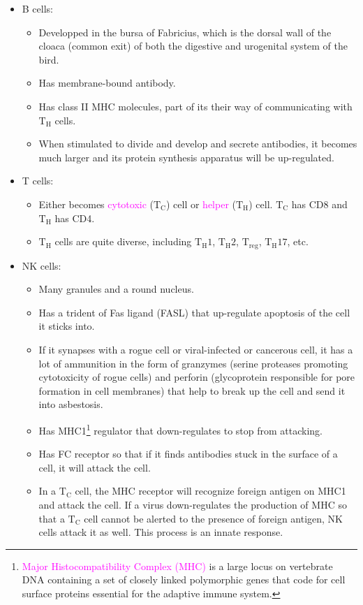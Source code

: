 \documentclass[UTF8]{book}
\newcommand{\concept}[1]{\textcolor{magenta}{#1}}
\begin{document}
\begin{itemize}
\item B cells:
\begin{itemize}
	\item Developped in the bursa of Fabricius, which is the dorsal wall of the cloaca (common exit) of both the digestive and urogenital system of the bird. 
	\item Has membrane-bound antibody.
	\item Has class II MHC molecules, part of its their way of communicating with $\mathrm{T_H}$ cells.
	\item When stimulated to divide and develop and secrete antibodies, it becomes much larger and its protein synthesis apparatus will be up-regulated. 
\end{itemize}
\item T cells:
\begin{itemize}
	\item Either becomes \concept{cytotoxic} ($\mathrm{T_C}$) cell or \concept{helper} ($\mathrm{T_H}$) cell. $\mathrm{T_C}$ has CD8 and $\mathrm{T_H}$ has CD4. 
	\item $\mathrm{T_H}$ cells are quite diverse, including $\mathrm{T_H}1$, $\mathrm{T_H}2$, $\mathrm{T_{reg}}$, $\mathrm{T_H}17$, etc.
\end{itemize}
\item NK cells:
\begin{itemize}
	\item Many granules and a round nucleus.
	\item Has a trident of Fas ligand (FASL) that up-regulate apoptosis of the cell it sticks into.
	\item If it synapses with a rogue cell or viral-infected or cancerous cell, it has a lot of ammunition in the form of granzymes (serine proteases promoting cytotoxicity of rogue cells) and perforin (glycoprotein responsible for pore formation in cell membranes) that help to break up the cell and send it into asbestosis.
	\item Has MHC1\footnote{\concept{Major Histocompatibility Complex (MHC)} is a large locus on vertebrate DNA containing a set of closely linked polymorphic genes that code for cell surface proteins essential for the adaptive immune system.} regulator that down-regulates to stop from attacking.
	\item Has FC receptor so that if it finds antibodies stuck in the surface of a cell, it will attack the cell.
	\item In a $\mathrm{T_C}$ cell, the MHC receptor will recognize foreign antigen on MHC1 and attack the cell. If a virus down-regulates the production of MHC so that a $\mathrm{T_C}$ cell cannot be alerted to the presence of foreign antigen, NK cells attack it as well. This process is an innate response.
\end{itemize}
\end{itemize}
\end{document}
